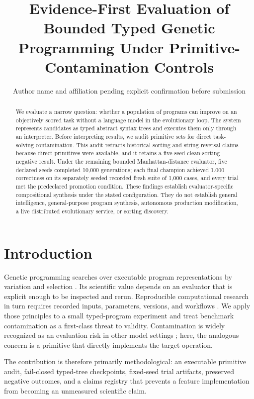 \documentclass[11pt]{article}
\title{Evidence-First Evaluation of Bounded Typed Genetic Programming Under Primitive-Contamination Controls}
\author{Author name and affiliation pending explicit confirmation before submission}
\date{}
\begin{document}
\maketitle

\begin{abstract}
We evaluate a narrow question: whether a population of programs can improve on an objectively scored task without a language model in the evolutionary loop. The system represents candidates as typed abstract syntax trees and executes them only through an interpreter. Before interpreting results, we audit primitive sets for direct task-solving contamination. This audit retracts historical sorting and string-reversal claims because direct primitives were available, and it retains a five-seed clean-sorting negative result. Under the remaining bounded Manhattan-distance evaluator, five declared seeds completed 10,000 generations; each final champion achieved 1.000 correctness on its separately seeded recorded fresh suite of 1,000 cases, and every trial met the predeclared promotion condition. These findings establish evaluator-specific compositional synthesis under the stated configuration. They do not establish general intelligence, general-purpose program synthesis, autonomous production modification, a live distributed evolutionary service, or sorting discovery.
\end{abstract}

\section{Introduction}

Genetic programming searches over executable program representations by variation and selection \cite{koza1992}. Its scientific value depends on an evaluator that is explicit enough to be inspected and rerun. Reproducible computational research in turn requires recorded inputs, parameters, versions, and workflows \cite{sandve2013}. We apply those principles to a small typed-program experiment and treat benchmark contamination as a first-class threat to validity. Contamination is widely recognized as an evaluation risk in other model settings \cite{xu2024}; here, the analogous concern is a primitive that directly implements the target operation.

The contribution is therefore primarily methodological: an executable primitive audit, fail-closed typed-tree checkpoints, fixed-seed trial artifacts, preserved negative outcomes, and a claims registry that prevents a feature implementation from becoming an unmeasured scientific claim.
\end{document}
